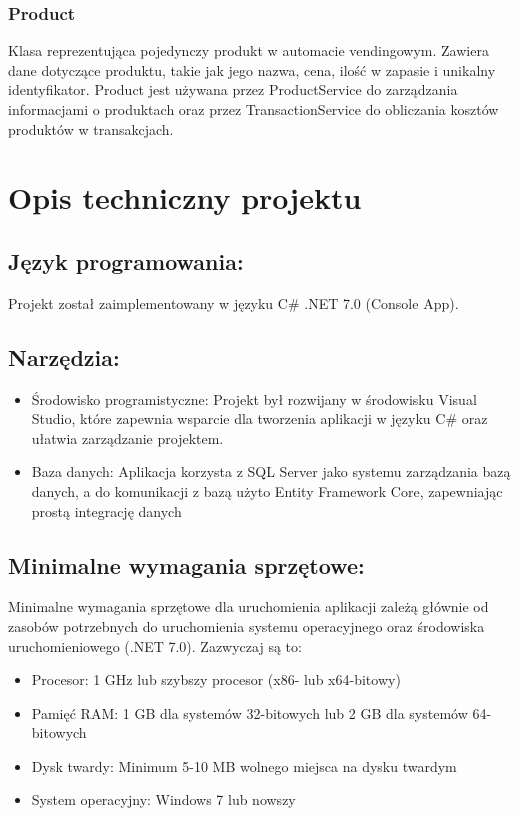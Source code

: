 \subsubsection*{Product}
Klasa reprezentująca pojedynczy produkt w automacie vendingowym. Zawiera dane dotyczące produktu, takie jak jego nazwa, cena, ilość w zapasie i unikalny identyfikator. Product jest używana przez ProductService do zarządzania informacjami o produktach oraz przez TransactionService do obliczania kosztów produktów w transakcjach.



\section{Opis techniczny projektu}


\subsection{Język programowania:}
Projekt został zaimplementowany w języku C\# .NET 7.0 (Console App).

\subsection{Narzędzia:}
\begin{itemize}
    \item Środowisko programistyczne: Projekt był rozwijany w środowisku Visual Studio, które zapewnia wsparcie dla tworzenia aplikacji w języku C\# oraz ułatwia zarządzanie projektem.
    \item Baza danych: Aplikacja korzysta z SQL Server jako systemu zarządzania bazą danych, a do komunikacji z bazą użyto Entity Framework Core, zapewniając prostą integrację danych
\end{itemize}

\subsection{Minimalne wymagania sprzętowe:}
Minimalne wymagania sprzętowe dla uruchomienia aplikacji zależą głównie od zasobów potrzebnych do uruchomienia systemu operacyjnego oraz środowiska uruchomieniowego (.NET 7.0). Zazwyczaj są to:
\begin{itemize}
    \item Procesor: 1 GHz lub szybszy procesor (x86- lub x64-bitowy)
    \item Pamięć RAM: 1 GB dla systemów 32-bitowych lub 2 GB dla systemów 64-bitowych
    \item Dysk twardy: Minimum 5-10 MB wolnego miejsca na dysku twardym
    \item System operacyjny: Windows 7 lub nowszy
\end{itemize}


